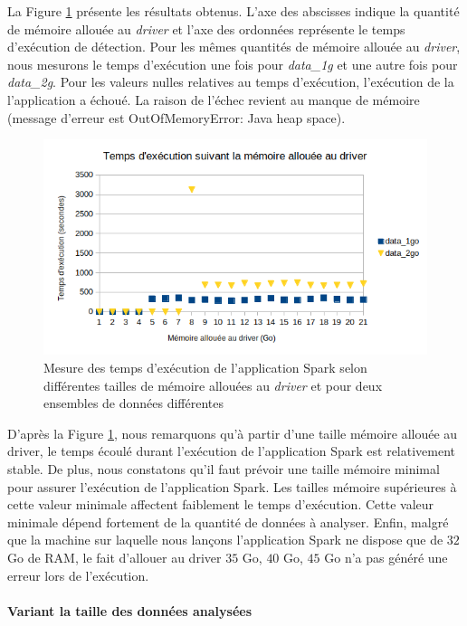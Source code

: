 La Figure 	\ref{fig:variantdrivermemory} présente les résultats obtenus. L'axe des abscisses indique la quantité de mémoire allouée au \textit{driver} et l'axe des ordonnées représente le temps d'exécution de détection. Pour les mêmes quantités de mémoire allouée au \textit{driver}, nous mesurons le temps d'exécution une fois pour  \textit{data\_1g}  et une autre fois pour  \textit{data\_2g}.
Pour les valeurs nulles relatives au temps d'exécution, l'exécution de la l'application a échoué. La raison de l'échec revient au manque de mémoire (message d'erreur est OutOfMemoryError: Java heap space).
\begin{figure}[H]
	\centering
	\captionsetup{justification=centering}
	\includegraphics[width=1\linewidth]{illustrations/variant_driver_memory}
	\caption{Mesure des temps d'exécution de l'application Spark selon différentes tailles de mémoire allouées au \textit{driver} et pour deux ensembles de données différentes}
	\label{fig:variantdrivermemory}
\end{figure}

D'après la Figure 	\ref{fig:variantdrivermemory}, nous remarquons qu'à partir d'une taille mémoire allouée au driver, le temps écoulé durant l'exécution de l'application Spark est relativement stable. De plus, nous constatons qu'il faut prévoir une taille mémoire minimal pour assurer l'exécution de l'application Spark. Les tailles mémoire supérieures à cette valeur minimale affectent faiblement le temps d'exécution.  Cette valeur minimale dépend fortement de la quantité de données à analyser. Enfin, malgré que la machine sur laquelle nous lançons l'application Spark ne dispose que de $ 32 $ Go de RAM, le fait d'allouer au driver $ 35 $ Go, $ 40$ Go, $ 45 $ Go n'a pas généré une erreur lors de l'exécution.

\paragraph{Variant la taille des données analysées}~

